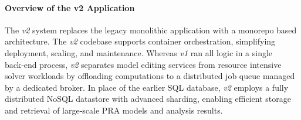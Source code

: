 \paragraph{Overview of the v2 Application}

\begin{comment}
The \textit{v2} update was driven by the need to improve openness, scalability, and solver flexibility. Three major goals encapsulate these objectives:
\begin{enumerate}
    \item \textbf{Architectural overhaul for extensibility and maintainability}, ensuring that new quantification methods or specialized back ends can be more easily integrated. 
    \item \textbf{Distributed computing and parallelization}, allowing a larger number of simultaneous analyses and more rigorous Monte Carlo sampling under high-throughput demands. 
    \item \textbf{Open-source licensing and community involvement}, encouraging collaboration from researchers and practitioners who can actively contribute domain-specific plug-ins or enhancements.
\end{enumerate}

\subsubsection{Architectural and Implementation Differences}
\subsubsection{Solver Integration and Model Exchange}
\subsubsection{Performance and Scalability Enhancements}
\end{comment}

The \textit{v2} system replaces the legacy monolithic application with a monorepo based architecture. The \textit{v2} codebase supports container orchestration, simplifying deployment, scaling, and maintenance. Whereas \textit{v1} ran all logic in a single back‑end process, \textit{v2} separates model editing services from resource intensive solver workloads by offloading computations to a distributed job queue managed by a dedicated broker. In place of the earlier SQL database, \textit{v2} employs a fully distributed NoSQL datastore with advanced sharding, enabling efficient storage and retrieval of large‑scale PRA models and analysis results.

